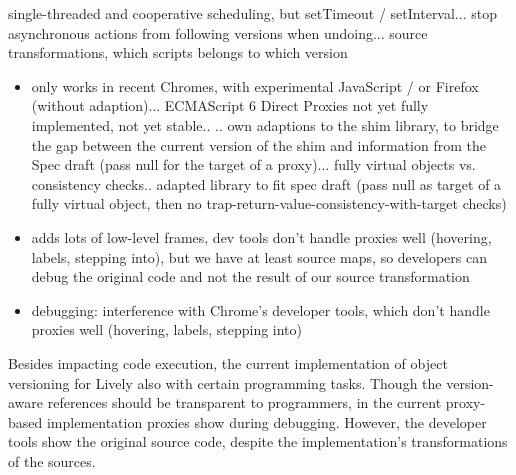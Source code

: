 single-threaded and cooperative scheduling, but setTimeout / setInterval... stop asynchronous actions from following versions when undoing... source transformations, which scripts belongs to which version



\begin{itemize}
    \item only works in recent Chromes, with experimental JavaScript / or Firefox (without adaption)... ECMAScript 6 Direct Proxies not yet fully implemented, not yet stable..
.. own adaptions to the shim library, to bridge the gap between the current version of the shim and information from the Spec draft (pass null for the target of a proxy)... fully virtual objects vs. consistency checks.. adapted library to fit spec draft (pass null as target of a fully virtual object, then no trap-return-value-consistency-with-target checks)
\end{itemize}
    






\begin{itemize}
    \item adds lots of low-level frames, dev tools don’t handle proxies well (hovering, labels, stepping into), but we have at least source maps, so developers can debug the original code and not the result of our source transformation
    \item debugging: interference with Chrome's developer tools, which don’t handle proxies well (hovering, labels, stepping into)
\end{itemize}


Besides impacting code execution, the current implementation of object versioning for Lively also  with certain programming tasks.
Though the version-aware references should be transparent to programmers, in the current proxy-based implementation proxies show during debugging.
However, the developer tools show the original source code, despite the implementation's transformations of the sources.
